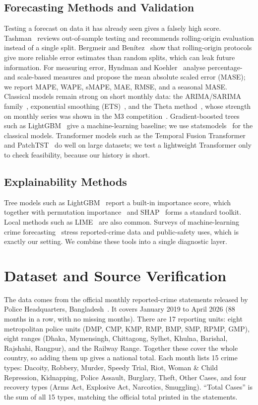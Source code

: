 \documentclass[conference]{IEEEtran}
\begin{document}
\subsection{Forecasting Methods and Validation}
Testing a forecast on data it has already seen gives a falsely high score. Tashman~\cite{tashman2000}
reviews out-of-sample testing and recommends rolling-origin evaluation instead of a single split.
Bergmeir and Ben\'itez~\cite{bergmeir2012} show that rolling-origin protocols give more reliable
error estimates than random splits, which can leak future information. For measuring error,
Hyndman and Koehler~\cite{hyndman2006} analyse percentage- and scale-based measures and propose
the mean absolute scaled error (MASE); we report MAPE, WAPE, sMAPE, MAE, RMSE, and a seasonal
MASE. Classical models remain strong on short monthly data: the ARIMA/SARIMA
family~\cite{boxjenkins2015}, exponential smoothing (ETS)~\cite{hyndman2002ets}, and the Theta
method~\cite{assimakopoulos2000theta}, whose strength on monthly series was shown in the M3
competition~\cite{makridakis2000m3}. Gradient-boosted trees such as
LightGBM~\cite{ke2017lightgbm} give a machine-learning baseline; we use
statsmodels~\cite{seabold2010statsmodels} for the classical models. Transformer models such as the
Temporal Fusion Transformer~\cite{lim2021tft} and PatchTST~\cite{nie2023patchtst} do well on large
datasets; we test a lightweight Transformer only to check feasibility, because our history is
short.

\subsection{Explainability Methods}
Tree models such as LightGBM~\cite{ke2017lightgbm} report a built-in importance score, which
together with permutation importance~\cite{breiman2001} and SHAP~\cite{lundberg2017shap} forms a
standard toolkit. Local methods such as LIME~\cite{ribeiro2016lime} are also common. Surveys of
machine-learning crime forecasting~\cite{yin2023crime} stress reported-crime data and public-safety
uses, which is exactly our setting. We combine these tools into a single diagnostic layer.

\section{Dataset and Source Verification}
The data comes from the official monthly reported-crime statements released by Police
Headquarters, Bangladesh~\cite{phq_source}. It covers January 2019 to April 2026 (88 months in a row,
with no missing months). There are 17 reporting units: eight metropolitan police units (DMP, CMP,
KMP, RMP, BMP, SMP, RPMP, GMP), eight ranges (Dhaka, Mymensingh, Chittagong, Sylhet, Khulna,
Barishal, Rajshahi, Rangpur), and the Railway Range. Together these cover the whole country, so
adding them up gives a national total. Each month lists 15 crime types: Dacoity, Robbery, Murder,
Speedy Trial, Riot, Woman \& Child Repression, Kidnapping, Police Assault, Burglary, Theft, Other
Cases, and four recovery types (Arms Act, Explosive Act, Narcotics, Smuggling). ``Total Cases'' is
the sum of all 15 types, matching the official total printed in the statements.
\end{document}
